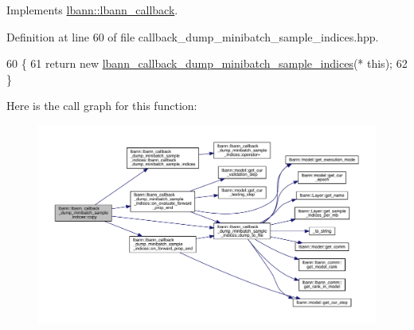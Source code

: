 Implements \hyperlink{classlbann_1_1lbann__callback_a9f545d1269a8c7af335625d049691f26}{lbann\+::lbann\+\_\+callback}.



Definition at line 60 of file callback\+\_\+dump\+\_\+minibatch\+\_\+sample\+\_\+indices.\+hpp.


\begin{DoxyCode}
60                                                                       \{
61     \textcolor{keywordflow}{return} \textcolor{keyword}{new} \hyperlink{classlbann_1_1lbann__callback__dump__minibatch__sample__indices_a32e575722f9ad6f5a48a3fad20282075}{lbann\_callback\_dump\_minibatch\_sample\_indices}(*\textcolor{keyword}{
      this});
62   \}
\end{DoxyCode}
Here is the call graph for this function\+:\nopagebreak
\begin{figure}[H]
\begin{center}
\leavevmode
\includegraphics[width=350pt]{classlbann_1_1lbann__callback__dump__minibatch__sample__indices_a6847ea742037dbe5f4ee6d2b4b4307a4_cgraph}
\end{center}
\end{figure}
\mbox{\label{classlbann_1_1lbann__callback__dump__minibatch__sample__indices_a34d4564309168b3ab0b2e3092e2f9355}} 
